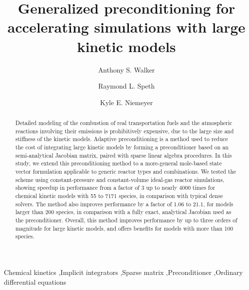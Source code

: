 \documentclass[preprint, 12pt]{elsarticle}
\begin{document}
\begin{frontmatter}

    \title{\LARGE Generalized preconditioning for accelerating simulations with large kinetic models}


    \author[inst1]{Anthony S.  Walker}
    \author[inst2]{Raymond L. Speth}
    \author[inst1]{Kyle E. Niemeyer}


    \begin{abstract}
        Detailed modeling of the combustion of real transportation fuels and the atmospheric reactions involving their emissions is prohibitively expensive, due to the large size and stiffness of the kinetic models.
        Adaptive preconditioning is a method used to reduce the cost of integrating large kinetic models by forming a preconditioner based on an semi-analytical Jacobian matrix, paired with sparse linear algebra procedures.
        In this study, we extend this preconditioning method to a more-general mole-based state vector formulation applicable to generic reactor types and combinations.
        We tested the scheme using constant-pressure and constant-volume ideal-gas reactor simulations, showing speedup in performance from a factor of 3 up to nearly 4000 times for chemical kinetic models with 55 to 7171 species, in comparison with typical dense solvers.
        The method also improves performance by a factor of 1.06 to 21.1, for models larger than 200 species, in comparison with a fully exact, analytical Jacobian used as the preconditioner.
        Overall, this method improves performance by up to three orders of magnitude for large kinetic models, and offers benefits for models with more than 100 species.
    \end{abstract}

    \begin{keyword}
    Chemical kinetics \sep Implicit integrators \sep Sparse matrix \sep Preconditioner \sep Ordinary diﬀerential equations
    \end{keyword}

    \end{frontmatter}
\end{document}
